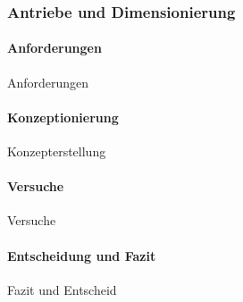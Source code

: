 \documentclass[main.tex]{subfiles} %
\begin{document}

\subsubsection{Antriebe und Dimensionierung}

\paragraph{Anforderungen}
Anforderungen

\paragraph{Konzeptionierung}
Konzepterstellung

\paragraph{Versuche}
Versuche

\paragraph{Entscheidung und Fazit}
Fazit und Entscheid
\end{document}
